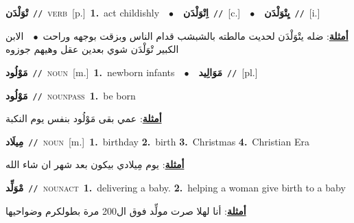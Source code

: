 \documentclass[10pt,a4paper,twoside]{article} %
\begin{document}
\begin{multicols}{2}
{\setlength\topsep{0pt}\textbf{\foreignlanguage{arabic}{تْوَلْدَن}}\ {\color{gray}\texttt{//}\color{black}}\ \textsc{verb}\ [p.]\ \textbf{1.}~act childishly\ \ $\bullet$\ \ \setlength\topsep{0pt}\textbf{\foreignlanguage{arabic}{اِتْوَلْدَن}}\ {\color{gray}\texttt{//}\color{black}}\ [c.]\ \ $\bullet$\ \ \setlength\topsep{0pt}\textbf{\foreignlanguage{arabic}{يِتْوَلْدَن}}\ {\color{gray}\texttt{//}\color{black}}\ [i.]\  \begin{flushright}\color{gray}\foreignlanguage{arabic}{\textbf{\underline{\foreignlanguage{arabic}{أمثلة}}}: ضله يتْوَلْدَن لحديت مالطته بالشبشب قدام الناس وبزقت بوجهه وراحت\ $\bullet$\ \  الابن الكبير تْوَلْدَن شوي بعدين عقل وهيهم جوزوه}\end{flushright}\color{black}} \vspace{2mm}

{\setlength\topsep{0pt}\textbf{\foreignlanguage{arabic}{مَوْلُود}}\ {\color{gray}\texttt{//}\color{black}}\ \textsc{noun}\ [m.]\ \textbf{1.}~newborn infants\ \ $\bullet$\ \ \setlength\topsep{0pt}\textbf{\foreignlanguage{arabic}{مَوَالِيد}}\ {\color{gray}\texttt{//}\color{black}}\ [pl.]\ } \vspace{2mm}

{\setlength\topsep{0pt}\textbf{\foreignlanguage{arabic}{مَوْلُود}}\ {\color{gray}\texttt{//}\color{black}}\ \textsc{noun\textunderscore pass}\ \textbf{1.}~be born\  \begin{flushright}\color{gray}\foreignlanguage{arabic}{\textbf{\underline{\foreignlanguage{arabic}{أمثلة}}}: عمي بقى مَوْلُود بنفس يوم النكبة}\end{flushright}\color{black}} \vspace{2mm}

{\setlength\topsep{0pt}\textbf{\foreignlanguage{arabic}{مِيلَاد}}\ {\color{gray}\texttt{//}\color{black}}\ \textsc{noun}\ [m.]\ \textbf{1.}~birthday  \textbf{2.}~birth  \textbf{3.}~Christmas  \textbf{4.}~Christian Era\  \begin{flushright}\color{gray}\foreignlanguage{arabic}{\textbf{\underline{\foreignlanguage{arabic}{أمثلة}}}: يوم مِيلادي بيكون بعد شهر ان شاء الله}\end{flushright}\color{black}} \vspace{2mm}

{\setlength\topsep{0pt}\textbf{\foreignlanguage{arabic}{مْوَلِّد}}\ {\color{gray}\texttt{//}\color{black}}\ \textsc{noun\textunderscore act}\ \textbf{1.}~delivering a baby.  \textbf{2.}~helping a woman give birth to a baby\  \begin{flushright}\color{gray}\foreignlanguage{arabic}{\textbf{\underline{\foreignlanguage{arabic}{أمثلة}}}: أنا لهلا صرت مولِّد فوق ال200 مرة بطولكرم وضواحيها}\end{flushright}\color{black}} \vspace{2mm}


\end{multicols}
\end{document}
